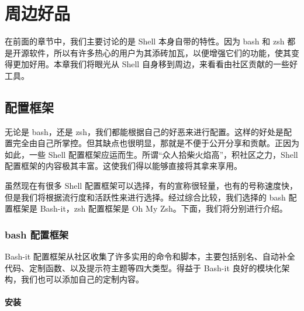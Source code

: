 \documentclass[]{ctexbook}
\newenvironment{Shaded}{\begin{snugshade}}{\end{snugshade}}
\newcommand{\ExtensionTok}[1]{#1}
\newcommand{\FunctionTok}[1]{\textcolor[rgb]{0.00,0.00,0.00}{#1}}
\newcommand{\KeywordTok}[1]{\textcolor[rgb]{0.13,0.29,0.53}{\textbf{#1}}}
\newcommand{\NormalTok}[1]{#1}
\newcommand{\VariableTok}[1]{\textcolor[rgb]{0.00,0.00,0.00}{#1}}
\begin{document}
\begin{Shaded}
\end{Shaded}

\hypertarget{ux5468ux8fb9ux597dux54c1}{%
\chapter{周边好品}\label{ux5468ux8fb9ux597dux54c1}}

在前面的章节中，我们主要讨论的是 Shell 本身自带的特性。因为 bash 和 zsh 都是开源软件，所以有许多热心的用户为其添砖加瓦，以便增强它们的功能，使其变得更加好用。本章我们将眼光从 Shell 自身移到周边，来看看由社区贡献的一些好工具。

\hypertarget{ux914dux7f6eux6846ux67b6}{%
\section{配置框架}\label{ux914dux7f6eux6846ux67b6}}

无论是 bash，还是 zsh，我们都能根据自己的好恶来进行配置。这样的好处是配置完全由自己所掌控。但其缺点也很明显，那就是不便于公开分享和贡献。正因为如此，一些 Shell 配置框架应运而生。所谓``众人拾柴火焰高''，积社区之力，Shell 配置框架的内容极其丰富。这使我们得以能够直接将其拿来享用。

虽然现在有很多 Shell 配置框架可以选择，有的宣称很轻量，也有的号称速度快，但是我们将根据流行度和活跃性来进行选择。经过综合比较，我们选择的 bash 配置框架是 Bash-it，zsh 配置框架是 Oh My Zsh。下面，我们将分别进行介绍。

\hypertarget{bash-ux914dux7f6eux6846ux67b6}{%
\subsection{bash 配置框架}\label{bash-ux914dux7f6eux6846ux67b6}}

Bash-it 配置框架从社区收集了许多实用的命令和脚本，主要包括别名、自动补全代码、定制函数、以及提示符主题等四大类型。得益于 Bash-it 良好的模块化架构，我们也可以添加自己的定制内容。

\hypertarget{ux5b89ux88c5}{%
\subsubsection{安装}\label{ux5b89ux88c5}}
\end{document}
